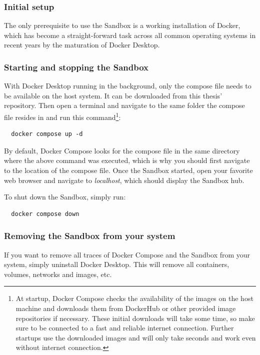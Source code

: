 \documentclass[11pt, a4paper, oneside, parskip=full-]{scrartcl}
\begin{document}
\subsubsection*{Initial setup}
The only prerequisite to use the Sandbox is a working installation of Docker,
which has become a straight-forward task across all common operating systems in
recent years by the maturation of Docker Desktop\cite{dockerdesktop}.

\subsubsection*{Starting and stopping the Sandbox}
With Docker Desktop running in the background, only the compose file needs to be
available on the host system. It can be downloaded from this thesis'
repository\cite{sandboxcomposefile}. Then open a terminal and navigate to the
same folder the compose file resides in and run this command\footnote{At
startup, Docker Compose checks the availability of the images on the host
machine and downloads them from DockerHub or other provided image repositories
if necessary. These initial downloads will take some time, so make sure to be
connected to a fast and reliable internet connection. Further startups use the
downloaded images and will only take seconds and work even without internet
connection.}:
\begin{lstlisting}
  docker compose up -d
\end{lstlisting}

By default, Docker Compose looks for the compose file in the same directory
where the above command was executed, which is why you should first navigate to
the location of the compose file. Once the Sandbox started, open your favorite
web browser and navigate to \emph{localhost}, which should display the Sandbox
hub.

To shut down the Sandbox, simply run:
\begin{lstlisting}
  docker compose down
\end{lstlisting}

\subsubsection*{Removing the Sandbox from your system}
If you want to remove all traces of Docker Compose and the Sandbox from your
system, simply uninstall Docker Desktop. This will remove all containers,
volumes, networks and images, etc.

\end{document}
